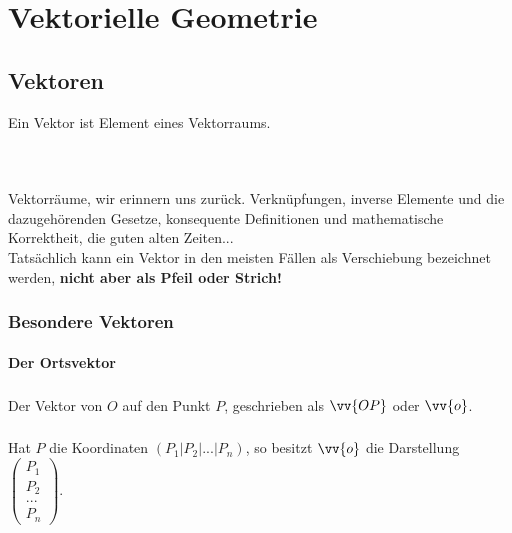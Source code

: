 \chapter{Vektorielle Geometrie}


\section{Vektoren}
    \begin{Definition}
        Ein Vektor ist Element eines Vektorraums.
    \end{Definition}\\
    \paragraph{} Vektorräume, wir erinnern uns zurück. Verknüpfungen, inverse Elemente und die dazugehörenden Gesetze, konsequente Definitionen und
    mathematische Korrektheit, die guten alten Zeiten...\\
    Tatsächlich kann ein Vektor in den meisten Fällen als Verschiebung bezeichnet werden, \textbf{nicht aber als Pfeil oder Strich!}\\

    \subsection{Besondere Vektoren}

        \subsubsection{Der Ortsvektor}

            \paragraph{} Der Vektor von $O$ auf den Punkt $P$, geschrieben als $\vv{OP}$ oder $\vv{o}$.\\
            \paragraph{} Hat $P$ die Koordinaten $(P_1|P_2|...|P_n)$, so besitzt $\vv{o}$ die Darstellung $\left(\begin{array}{c} P_1 \\ P_2 \\ ...\\P_n\end{array}\right)$.

